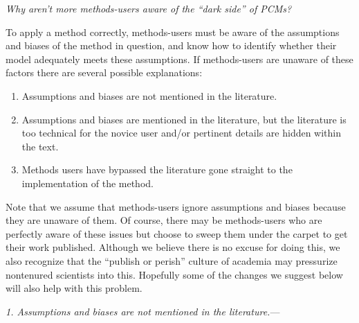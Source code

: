 \documentclass[a4paper,12pt]{article}
\renewcommand{\subsection}[1]{%
\bigskip
\begin{center}
\begin{large}
\normalfont\itshape #1
\end{large}
\end{center}}
\renewcommand{\subsubsection}[1]{%
\vspace{2ex}
\noindent
\textit{#1.}---}
\begin{document}

\subsection{Why aren't more methods-users aware of the ``dark side'' of PCMs?}

To apply a method correctly, methods-users must be aware of the assumptions and biases of the method in question, and know how to identify whether their model adequately meets these assumptions. If methods-users are unaware of these factors there are several possible explanations:

\begin{enumerate}
\item Assumptions and biases are not mentioned in the literature.
\item Assumptions and biases are mentioned in the literature, but the literature is too technical for the novice user and/or pertinent details are hidden within the text.
\item Methods users have bypassed the literature gone straight to the implementation of the method.
\end{enumerate}

Note that we assume that methods-users ignore assumptions and biases because they are unaware of them. Of course, there may be methods-users who are perfectly aware of these issues but choose to sweep them under the carpet to get their work published. Although we believe there is no excuse for doing this, we also recognize that the ``publish or perish'' culture of academia may pressurize nontenured scientists into this. Hopefully some of the changes we suggest below will also help with this problem.

\subsubsection{1. Assumptions and biases are not mentioned in the literature}


\end{document}
